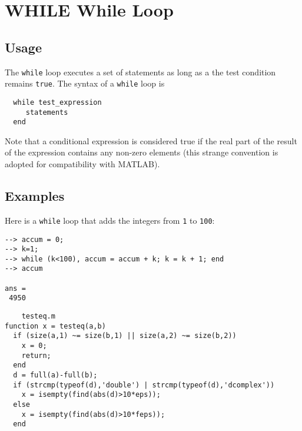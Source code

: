 \section{WHILE While Loop}

\subsection{Usage}

The \verb|while| loop executes a set of statements as long as
a the test condition remains \verb|true|.  The syntax of a 
\verb|while| loop is
\begin{verbatim}
  while test_expression
     statements
  end
\end{verbatim}
Note that a conditional expression is considered true if 
the real part of the result of the expression contains
any non-zero elements (this strange convention is adopted
for compatibility with MATLAB).
\subsection{Examples}

Here is a \verb|while| loop that adds the integers from \verb|1|
to \verb|100|:
\begin{verbatim}
--> accum = 0;
--> k=1;
--> while (k<100), accum = accum + k; k = k + 1; end
--> accum

ans = 
 4950 
\end{verbatim}
\begin{verbatim}
    testeq.m
function x = testeq(a,b)
  if (size(a,1) ~= size(b,1) || size(a,2) ~= size(b,2))
    x = 0;
    return;
  end
  d = full(a)-full(b);
  if (strcmp(typeof(d),'double') | strcmp(typeof(d),'dcomplex'))
    x = isempty(find(abs(d)>10*eps));
  else
    x = isempty(find(abs(d)>10*feps));
  end
\end{verbatim}
